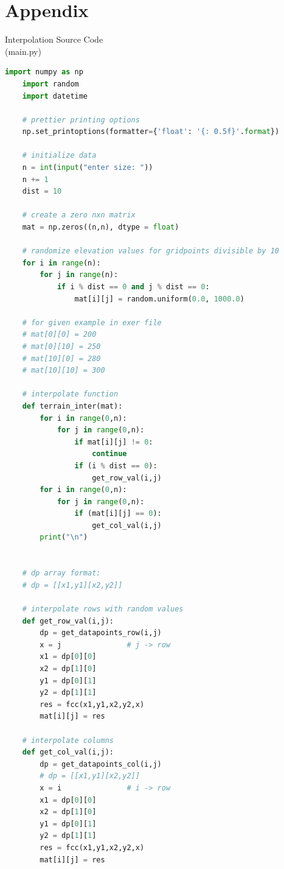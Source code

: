 \documentclass{article}
\begin{document}
\printbibliography{}


\pagebreak
\section*{\centering Appendix}
\begin{center}
Interpolation Source Code \\ (main.py)
\end{center}
\begin{lstlisting}[language=Python]
    import numpy as np
    import random
    import datetime
    
    # prettier printing options
    np.set_printoptions(formatter={'float': '{: 0.5f}'.format})
    
    # initialize data
    n = int(input("enter size: "))
    n += 1
    dist = 10
    
    # create a zero nxn matrix
    mat = np.zeros((n,n), dtype = float)
    
    # randomize elevation values for gridpoints divisible by 10
    for i in range(n):
        for j in range(n):
            if i % dist == 0 and j % dist == 0:
                mat[i][j] = random.uniform(0.0, 1000.0)
    
    # for given example in exer file
    # mat[0][0] = 200
    # mat[0][10] = 250
    # mat[10][0] = 280
    # mat[10][10] = 300
    
    # interpolate function
    def terrain_inter(mat):
        for i in range(0,n):
            for j in range(0,n):
                if mat[i][j] != 0:
                    continue
                if (i % dist == 0):
                    get_row_val(i,j)
        for i in range(0,n):
            for j in range(0,n):
                if (mat[i][j] == 0):
                    get_col_val(i,j)
        print("\n")
    
    
    # dp array format:
    # dp = [[x1,y1][x2,y2]]
    
    # interpolate rows with random values
    def get_row_val(i,j):
        dp = get_datapoints_row(i,j)
        x = j               # j -> row
        x1 = dp[0][0]
        x2 = dp[1][0]
        y1 = dp[0][1]
        y2 = dp[1][1]
        res = fcc(x1,y1,x2,y2,x)
        mat[i][j] = res
    
    # interpolate columns
    def get_col_val(i,j):
        dp = get_datapoints_col(i,j)
        # dp = [[x1,y1][x2,y2]]
        x = i               # i -> row
        x1 = dp[0][0]
        x2 = dp[1][0]
        y1 = dp[0][1]
        y2 = dp[1][1]
        res = fcc(x1,y1,x2,y2,x)
        mat[i][j] = res
    

\end{lstlisting}
\end{document}

